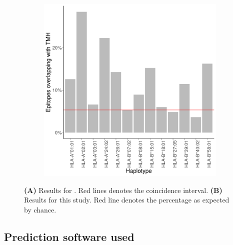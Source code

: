 \begin{figure}
\begin{subfigure}[t]{0.45\textwidth}
    \includegraphics[width=\linewidth]{bbbq_1_smart_results/fig_f_tmh_2_human_mhc1.png}
    \label{fig:bilderbeek_et_al_2021_1a}
  \end{subfigure}

  \caption{
    \textbf{(A)} 
    Results for \cite{bianchi2017}. 
    Red lines denotes the coincidence interval.
    \textbf{(B)}
    Results for this study.
    Red line denotes the percentage as expected by chance.
  }
\end{figure}

\subsection{Prediction software used}
\label{subsec:prediction_software_used}

